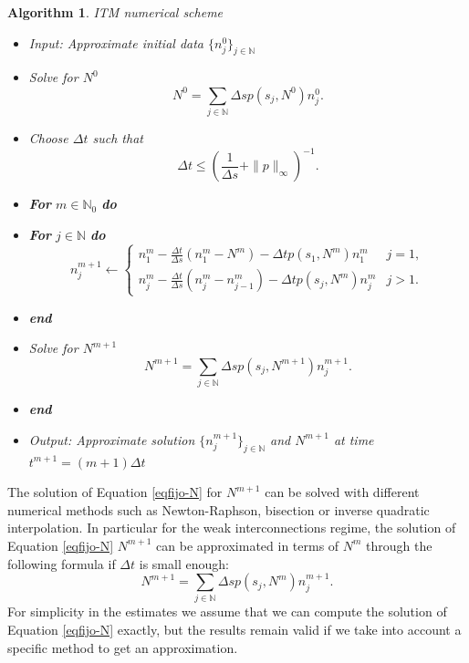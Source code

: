 \documentclass[11pt,a4paper]{article}
\newcommand{\N}{\mathbb{N}}
\newtheorem{Alg}{Algorithm}[section]
\begin{document}
\begin{Alg}{ITM numerical scheme }\label{Alg}
 \begin{itemize}
 \item[] {Input: Approximate initial data $\{n^0_j\}_{j\in\N}$}
 \item[] Solve for $N^0$
    \begin{equation}
    \label{eqfijo-N0}
     N^{0}= \sum_{j\in\N}\Delta s p(s_j,N^{0}) n_j^{0}.
    \end{equation}  
 \item[] Choose $\Delta t$ such that 
 \begin{equation}\label{CFL}
     \Delta t \le \left(\frac{1}{\Delta s}+\|p\|_\infty\right)^{-1}.
 \end{equation}
 \item[] {\bf For} $m\in\N_0$ {\bf do}
 \item[] \hspace{0.5cm} {\bf For}  $j\in\N$ {\bf do}
 \begin{equation*}
     n_j^{m+1} \leftarrow
     \begin{cases}
      n_1^m-\frac{\Delta t}{\Delta s}(n_{1}^m-N^m)-\Delta t p(s_1,N^m)n_1^m & j=1,\\
      n_j^m-\frac{\Delta t}{\Delta s}(n_{j}^m-n_{j-1}^m)-\Delta t p(s_j,N^m)n_j^m & j>1.
     \end{cases}
 \end{equation*}
 \item[] \hspace{0.5cm} {\bf end} 
 \item[] \hspace{0.5cm} Solve for $N^{m+1}$ 
 \begin{equation}
 \label{eqfijo-N}
     N^{m+1}= \sum_{j\in\N}\Delta s p(s_j,N^{m+1}) n_j^{m+1}.
 \end{equation}
 \item[] {\bf end}
 \item[] { Output: Approximate solution $\{n_j^{m+1}\}_{j\in\N}$ and $N^{m+1}$ at time $t^{m+1}=(m+1)\Delta t$}
 \end{itemize} 
\end{Alg}

The solution of Equation \eqref{eqfijo-N} for $N^{m+1}$ can be solved with different numerical methods such as Newton-Raphson, bisection or inverse quadratic interpolation. In particular for the weak interconnections regime, the solution of Equation \eqref{eqfijo-N} $N^{m+1}$ can be approximated in terms of $N^{m}$ through the following formula if $\Delta t$ is small enough:
$$N^{m+1}= \sum_{j\in\N}\Delta s p(s_j,N^{m}) n_j^{m+1}.$$
For simplicity in the estimates we assume that we can compute the solution of Equation \eqref{eqfijo-N} exactly, but the results remain valid if we take into account a specific method to get an approximation.
\end{document}
